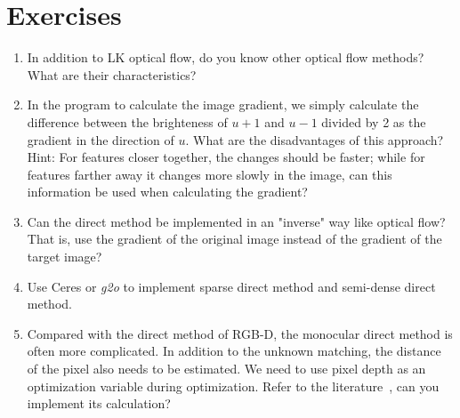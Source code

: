 \section*{Exercises}
\begin{enumerate}
	\item In addition to LK optical flow, do you know other optical flow methods? What are their characteristics?
	\item In the program to calculate the image gradient, we simply calculate the difference between the brighteness of $u+1$ and $u-1$ divided by 2 as the gradient in the direction of $u$. What are the disadvantages of this approach? Hint: For features closer together, the changes should be faster; while for features farther away it changes more slowly in the image, can this information be used when calculating the gradient?
	\item Can the direct method be implemented in an "inverse" way like optical flow? That is, use the gradient of the original image instead of the gradient of the target image?
	\item[\optional] Use Ceres or \textit{g2o} to implement sparse direct method and semi-dense direct method.
	\item Compared with the direct method of RGB-D, the monocular direct method is often more complicated. In addition to the unknown matching, the distance of the pixel also needs to be estimated. We need to use pixel depth as an optimization variable during optimization. Refer to the literature~\cite{Engel2013, Engel2014}, can you implement its calculation?
\end{enumerate}


